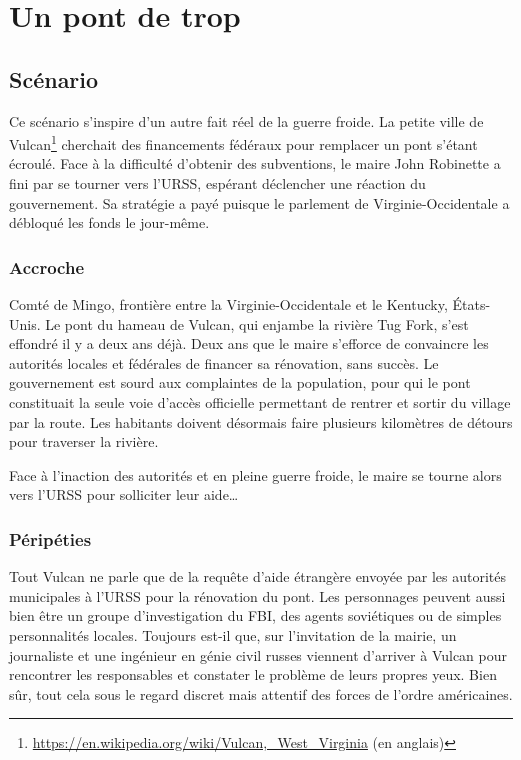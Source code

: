 \chapter{Un pont de trop}

\section{Scénario}

Ce scénario s'inspire d'un autre fait réel de la guerre froide. La petite ville de Vulcan\footnote{\url{https://en.wikipedia.org/wiki/Vulcan,_West_Virginia} (en anglais)} cherchait des financements fédéraux pour remplacer un pont s'étant écroulé.
Face à la difficulté d'obtenir des subventions, le maire John Robinette a fini par se tourner vers l'URSS, espérant déclencher une réaction du gouvernement.
Sa stratégie a payé puisque le parlement de Virginie-Occidentale a débloqué les fonds le jour-même.

\subsection{Accroche}

Comté de Mingo, frontière entre la Virginie-Occidentale et le Kentucky, États-Unis.
Le pont du hameau de Vulcan, qui enjambe la rivière Tug Fork, s'est effondré il y a deux ans déjà.
Deux ans que le maire s'efforce de convaincre les autorités locales et fédérales de financer sa rénovation, sans succès.
Le gouvernement est sourd aux complaintes de la population, pour qui le pont constituait la seule voie d'accès officielle permettant de rentrer et sortir du village par la route.
Les habitants doivent désormais faire plusieurs kilomètres de détours pour traverser la rivière.

Face à l'inaction des autorités et en pleine guerre froide, le maire se tourne alors vers l'URSS pour solliciter leur aide\dots

\subsection{Péripéties}

Tout Vulcan ne parle que de la requête d'aide étrangère envoyée par les autorités municipales à l'URSS pour la rénovation du pont.
Les personnages peuvent aussi bien être un groupe d'investigation du FBI, des agents soviétiques ou de simples personnalités locales. 
Toujours est-il que, sur l'invitation de la mairie, un journaliste et une ingénieur en génie civil russes viennent d'arriver à Vulcan pour rencontrer les responsables et constater le problème de leurs propres yeux.
Bien sûr, tout cela sous le regard discret mais attentif des forces de l'ordre américaines.

